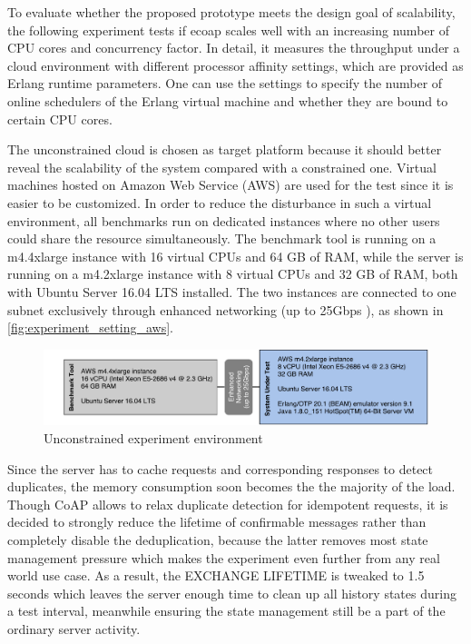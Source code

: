 To evaluate whether the proposed prototype meets the design goal of scalability, the following experiment tests if ecoap scales well with an increasing number of CPU cores and concurrency factor. In detail, it measures the throughput under a cloud environment with different processor affinity settings, which are provided as Erlang runtime parameters. One can use the settings to specify the number of online schedulers of the Erlang virtual machine and whether they are bound to certain CPU cores.

The unconstrained cloud is chosen as target platform because it should better reveal the scalability of the system compared with a constrained one. Virtual machines hosted on Amazon Web Service (AWS) are used for the test since it is easier to be customized. In order to reduce the disturbance in such a virtual environment, all benchmarks run on dedicated instances \autocite{aws_dedicated_instance} where no other users could share the resource simultaneously. The benchmark tool is running on a m4.4xlarge instance with 16 virtual CPUs and 64 GB of RAM, while the server is running on a m4.2xlarge instance with 8 virtual CPUs and 32 GB of RAM, both with Ubuntu Server 16.04 LTS installed. The two instances are connected to one subnet exclusively through enhanced networking (up to 25Gbps \autocite{aws_instance}), as shown in \autoref{fig:experiment_setting_aws}. 

\begin{figure}[!htbp]
\centering
\includegraphics[scale = 0.55]{experiment_setting_aws}
\caption{Unconstrained experiment environment}
\label{fig:experiment_setting_aws}
\end{figure}

Since the server has to cache requests and corresponding responses to detect duplicates, the memory consumption soon becomes the the majority of the load. Though CoAP allows to relax duplicate detection for idempotent requests, it is decided to strongly reduce the lifetime of confirmable messages rather than completely disable the deduplication, because the latter removes most state management pressure which makes the experiment even further from any real world use case. As a result, the EXCHANGE LIFETIME is tweaked to 1.5 seconds which leaves the server enough time to clean up all history states during a test interval, meanwhile ensuring the state management still be a part of the ordinary server activity.

